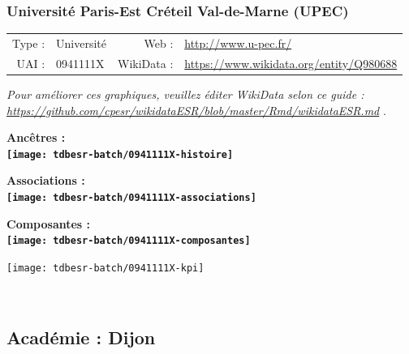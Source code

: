\documentclass[12pt,french,]{article}
\begin{document}
\hypertarget{universituxe9-paris-est-cruxe9teil-val-de-marne-upec}{%
\subsubsection{Université Paris-Est Créteil Val-de-Marne
(UPEC)}\label{universituxe9-paris-est-cruxe9teil-val-de-marne-upec}}

\begin{tabular*}{\textwidth}{rp{5cm}rl}  
\hline  
Type : & Université & Web : &\href{http://www.u-pec.fr/}{http://www.u-pec.fr/} \\  
UAI : & 0941111X & WikiData : & \href{https://www.wikidata.org/entity/Q980688}{https://www.wikidata.org/entity/Q980688} \\  
\hline  
\end{tabular*}

\textit{\scriptsize Pour améliorer ces graphiques, veuillez éditer WikiData selon ce guide :  \href{https://github.com/cpesr/wikidataESR/blob/master/Rmd/wikidataESR.md}{https://github.com/cpesr/wikidataESR/blob/master/Rmd/wikidataESR.md}}
.

\vspace{1cm}  
\begin{minipage}[b]{0.50\textwidth}\begin{center} \bf Ancêtres : \\  
\texttt{[image: tdbesr-batch/0941111X-histoire]} \end{center}\end{minipage}\begin{minipage}[b]{0.50\textwidth}\begin{center} \bf Associations : \\  
\texttt{[image: tdbesr-batch/0941111X-associations]} \end{center}\end{minipage}

\hrulefill

\begin{center} \bf Composantes : \\  
\texttt{[image: tdbesr-batch/0941111X-composantes]} \end{center}

\begin{center}\texttt{[image: tdbesr-batch/0941111X-kpi]} \end{center}\checkoddpage

\ifoddpage \fi ~\newpage  

\hypertarget{acaduxe9mie-dijon}{%
\subsection{Académie : Dijon}\label{acaduxe9mie-dijon}}
\end{document}
